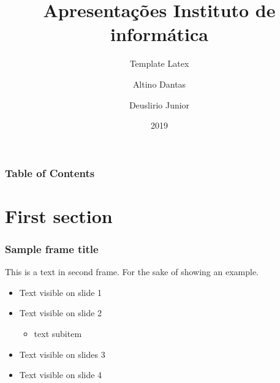 \documentclass[aspectratio=169,t]{beamer}
\begin{document}
\title[Inf UFG] %
{Apresentações Instituto de informática}
\subtitle{Template Latex}




\author{Altino Dantas \and Deuslirio Junior}

\date{2019}

\frame[noframenumbering]{\titlepage}











\horiz
\begin{frame}
\frametitle{Table of Contents}
\tableofcontents
\end{frame}


\section{First section}

\begin{frame}
\frametitle{Sample frame title}
This is a text in second frame. For the sake of showing an example.

\begin{itemize}
    \item<1-> Text visible on slide 1
    \item<2-> Text visible on slide 2
    \begin{itemize}
        \item text subitem
    \end{itemize}
    \item<3> Text visible on slides 3
    \item<4-> Text visible on slide 4
\end{itemize}
\end{frame}
\end{document}
